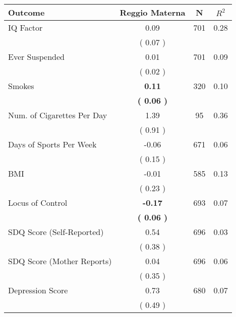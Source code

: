 \begin{tabular}{lccc}
\toprule
 \textbf{Outcome} & \textbf{Reggio Materna} & \textbf{N} & \textbf{$ R^2$} \\
\midrule
IQ Factor &      0.09 & 701 &      0.28 \\ 
 & (     0.07 ) & \\
Ever Suspended &      0.01 & 701 &      0.09 \\ 
 & (     0.02 ) & \\
Smokes & \textbf{     0.11} & 320 &      0.10 \\ 
 & \textbf{(     0.06 )} & \\
Num. of Cigarettes Per Day &      1.39 & 95 &      0.36 \\ 
 & (     0.91 ) & \\
Days of Sports Per Week &     -0.06 & 671 &      0.06 \\ 
 & (     0.15 ) & \\
BMI &     -0.01 & 585 &      0.13 \\ 
 & (     0.23 ) & \\
Locus of Control & \textbf{    -0.17} & 693 &      0.07 \\ 
 & \textbf{(     0.06 )} & \\
SDQ Score (Self-Reported) &      0.54 & 696 &      0.03 \\ 
 & (     0.38 ) & \\
SDQ Score (Mother Reports) &      0.04 & 696 &      0.06 \\ 
 & (     0.35 ) & \\
Depression Score &      0.73 & 680 &      0.07 \\ 
 & (     0.49 ) & \\
\bottomrule
\end{tabular}
